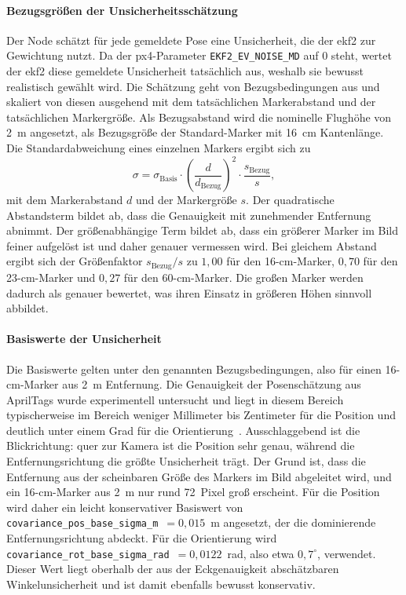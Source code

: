\paragraph{Bezugsgrößen der Unsicherheitsschätzung}
Der Node schätzt für jede gemeldete Pose eine Unsicherheit, die der \gls{ekf2} zur Gewichtung nutzt.
Da der \gls{px4}-Parameter \texttt{EKF2\_EV\_NOISE\_MD} auf $0$ steht, wertet der \gls{ekf2} diese gemeldete Unsicherheit tatsächlich aus, weshalb sie bewusst realistisch gewählt wird.
Die Schätzung geht von Bezugsbedingungen aus und skaliert von diesen ausgehend mit dem tatsächlichen Markerabstand und der tatsächlichen Markergröße.
Als Bezugsabstand wird die nominelle Flughöhe von 2~m angesetzt, als Bezugsgröße der Standard-Marker mit 16~cm Kantenlänge.
Die Standardabweichung eines einzelnen Markers ergibt sich zu
\begin{equation}
\sigma = \sigma_\text{Basis}\cdot\left(\frac{d}{d_\text{Bezug}}\right)^{2}\cdot\frac{s_\text{Bezug}}{s},
\label{eq:sigma_scaling}
\end{equation}
mit dem Markerabstand $d$ und der Markergröße $s$.
Der quadratische Abstandsterm bildet ab, dass die Genauigkeit mit zunehmender Entfernung abnimmt.
Der größenabhängige Term bildet ab, dass ein größerer Marker im Bild feiner aufgelöst ist und daher genauer vermessen wird.
Bei gleichem Abstand ergibt sich der Größenfaktor $s_\text{Bezug}/s$ zu $1{,}00$ für den 16-cm-Marker, $0{,}70$ für den 23-cm-Marker und $0{,}27$ für den 60-cm-Marker.
Die großen Marker werden dadurch als genauer bewertet, was ihren Einsatz in größeren Höhen sinnvoll abbildet.

\paragraph{Basiswerte der Unsicherheit}
Die Basiswerte gelten unter den genannten Bezugsbedingungen, also für einen 16-cm-Marker aus 2~m Entfernung.
Die Genauigkeit der Posenschätzung aus AprilTags wurde experimentell untersucht und liegt in diesem Bereich typischerweise im Bereich weniger Millimeter bis Zentimeter für die Position und deutlich unter einem Grad für die Orientierung~\cite{Kalaitzakis2021}.
Ausschlaggebend ist die Blickrichtung: quer zur Kamera ist die Position sehr genau, während die Entfernungsrichtung die größte Unsicherheit trägt.
Der Grund ist, dass die Entfernung aus der scheinbaren Größe des Markers im Bild abgeleitet wird, und ein 16-cm-Marker aus 2~m nur rund 72~Pixel groß erscheint.
Für die Position wird daher ein leicht konservativer Basiswert von \texttt{covariance\_pos\_base\_sigma\_m}~$=0{,}015$~m angesetzt, der die dominierende Entfernungsrichtung abdeckt.
Für die Orientierung wird \texttt{covariance\_rot\_base\_sigma\_rad}~$=0{,}0122$~rad, also etwa $0{,}7^\circ$, verwendet.
Dieser Wert liegt oberhalb der aus der Eckgenauigkeit abschätzbaren Winkelunsicherheit und ist damit ebenfalls bewusst konservativ.

